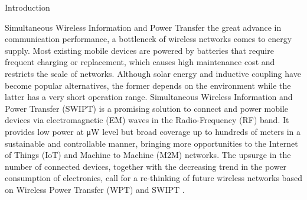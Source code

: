 \documentclass[journal]{IEEEtran}
\begin{document}
	\begin{section}{Introduction}
		\begin{subsection}{Simultaneous Wireless Information and Power Transfer}
			 the great advance in communication performance, a bottleneck of wireless networks comes to energy supply. Most existing mobile devices are powered by batteries that require frequent charging or replacement, which causes high maintenance cost and restricts the scale of networks. Although solar energy and inductive coupling have become popular alternatives, the former depends on the environment while the latter has a very short operation range. Simultaneous Wireless Information and Power Transfer (SWIPT) is a promising solution to connect and power mobile devices via electromagnetic (EM) waves in the Radio-Frequency (RF) band. It provides low power at \si{\uW} level but broad coverage up to hundreds of meters in a sustainable and controllable manner, bringing more opportunities to the Internet of Things (IoT) and Machine to Machine (M2M) networks. The upsurge in the number of connected devices, together with the decreasing trend in the power consumption of electronics, call for a re-thinking of future wireless networks based on Wireless Power Transfer (WPT) and SWIPT \cite{Clerckx2019}.


\end{subsection}
\end{section}
\end{document}

